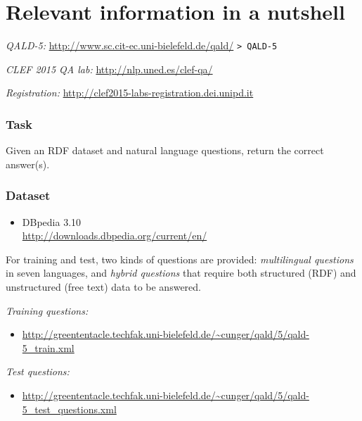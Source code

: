 \documentclass[a4paper]{article}
\begin{document}
{\newpage

\section{Relevant information in a nutshell}

{\em QALD-5:} \url{http://www.sc.cit-ec.uni-bielefeld.de/qald/} \texttt{> QALD-5}

{\em CLEF 2015 QA lab:} \url{http://nlp.uned.es/clef-qa/}

\emph{Registration:} \url{http://clef2015-labs-registration.dei.unipd.it}



\subsubsection*{Task}

Given an RDF dataset and natural language questions, return the correct answer(s). 

\subsubsection*{Dataset}

\begin{itemize} 
\item DBpedia 3.10\\ \url{http://downloads.dbpedia.org/current/en/}
\end{itemize} 

For training and test, two kinds of questions are provided: 
\emph{multilingual questions} in seven languages, 
and \emph{hybrid questions} that require both structured (RDF) and unstructured (free text) data to be answered.

{\em Training questions:} 

\vspace{-.3cm}

\begin{itemize} 
\item \url{http://greententacle.techfak.uni-bielefeld.de/~cunger/qald/5/qald-5_train.xml} 
\end{itemize} 

{\em Test questions:} 

\vspace{-.3cm}

\begin{itemize}
\item \url{http://greententacle.techfak.uni-bielefeld.de/~cunger/qald/5/qald-5_test_questions.xml} 
\end{itemize}

}
\end{document}
